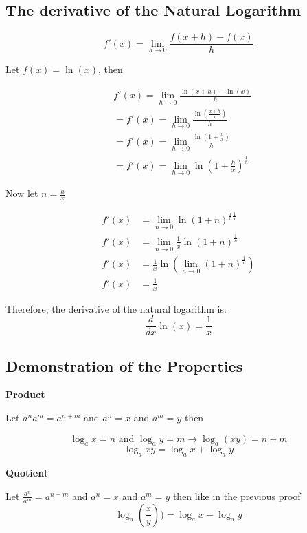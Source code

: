 \subsection{The derivative of the Natural Logarithm}

\[
f\prime(x) = \lim_{h \to 0} \frac{f(x + h) - f(x)}{h}
\]

Let \(f(x) = \ln(x)\), then

\begin{align*}
&f\prime(x) = \lim_{h \to 0} \frac{\ln(x + h) - \ln(x)}{h}\\
&= f\prime(x) = \lim_{h \to 0} \frac{\ln\left(\frac{x + h}{x}\right)}{h}\\
&= f\prime(x) = \lim_{h \to 0} \frac{\ln\left(1 + \frac{h}{x}\right)}{h}\\
&= f\prime(x) = \lim_{h \to 0} \ln\left(1 + \frac{h}{x}\right)^{\frac{1}{h}}
\end{align*}
 
Now let \(n = \frac{h}{x}\)

\begin{align*}
f\prime(x) &= \lim_{n \to 0} \ln\left(1 + n\right)^{\frac{x}{h} \frac{1}{x}}\\
f\prime(x) &= \lim_{n \to 0} \frac{1}{x} \ln\left(1 + n\right)^{\frac{1}{n}}\\
f\prime(x) &= \frac{1}{x} \ln \left(\lim_{n \to 0} (1 + n)^{\frac{1}{n}}\right)\\
f\prime(x) &= \frac{1}{x}
\end{align*}

Therefore, the derivative of the natural logarithm is:
\[
\frac{d}{dx} \ln(x) = \frac{1}{x}
\]
\QED

\subsection{Demonstration of the Properties}

\textbf{Product}

Let \(a^n a^m = a^{n + m}\) and \(a^n = x\) and \(a^m = y\) then

\[
\log_a x = n \text{ and } \log_a y = m \rightarrow \log_a (xy) = n + m
\]
\[
\log_a xy = \log_a x + \log_a y
\]

\QED

\textbf{Quotient}

Let \(\frac{a^n}{a^m} = a^{n - m}\) and \(a^n = x\) and \(a^m = y\) then like in the previous proof
\[
\log_a \left(\frac{x}{y}\right)) = \log_a x - \log_a y
\]
\QED 

